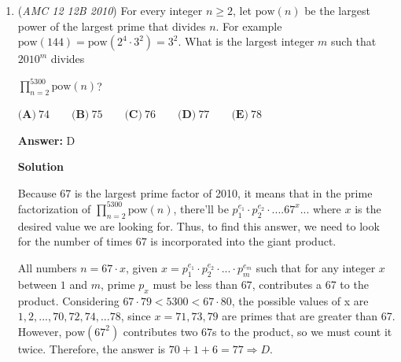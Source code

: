 \begin{enumerate}
As in the first solution, note that the expression can be translated into 
 \[\frac{1}{x+1}+\frac{1}{x}+\frac{1}{x-1}\ge1\] without affecting the interval lengths.

 This simplifies into 
 \[\frac{-x^3+3x^2+x-1}{(x)(x+1)(x-1)}\ge0,\] so 
 \[-x^3+3x^2+x-1\ge0.\]Each interval is $(-1, a), (0, b), (1, c)$, where $a$, $b$, and $c$ are the roots of $-x^3+3x^2+x-1=0$so the total length is $a+b+c$, which is the sum of the roots, or $\boxed3$.

 



\textbf{Solution 3}

Note that all of the answers but $C$ have weird factors of 2010, but 2010 is a random number (set $x'=x-2010$). So therefore the answer is $\fbox{C(3)}$



	\item (\textit{AMC 12 12B 2010}) For every integer $n\ge2$, let $\text{pow}(n)$ be the largest power of the largest prime that divides $n$. For example $\text{pow}(144)=\text{pow}(2^4\cdot3^2)=3^2$. What is the largest integer $m$ such that $2010^m$ divides


 
$\prod_{n=2}^{5300}\text{pow}(n)$?


 


 

$\textbf{(A)}\ 74 \qquad \textbf{(B)}\ 75 \qquad \textbf{(C)}\ 76 \qquad \textbf{(D)}\ 77 \qquad \textbf{(E)}\ 78$

 \textbf{Answer: }D



\textbf{Solution}

Because 67 is the largest prime factor of 2010, it means that in the prime factorization of $\prod_{n=2}^{5300}\text{pow}(n)$, there'll be $p_1 ^{e_1} \cdot p_2 ^{e_2} \cdot .... 67^x ...$ where $x$ is the desired value we are looking for. Thus, to find this answer, we need to look for the number of times $67$ is incorporated into the giant product.

 All numbers $n=67 \cdot x$, given $x = p_1 ^ {e_1} \cdot p_2 ^{e_2} \cdot ... \cdot p_m ^ {e_m}$ such that for any integer $x$ between $1$ and $m$, prime $p_x$ must be less than $67$, contributes a 67 to the product. Considering $67 \cdot 79 < 5300 < 67 \cdot 80$, the possible values of x are $1,2,...,70,72,74,...78$, since $x=71,73,79$ are primes that are greater than 67. However, $\text{pow}\left(67^2\right)$ contributes two $67$s to the product, so we must count it twice. Therefore, the answer is $70 + 1 + 6 = \boxed{77} \Rightarrow \boxed{D}$.


\end{enumerate}
